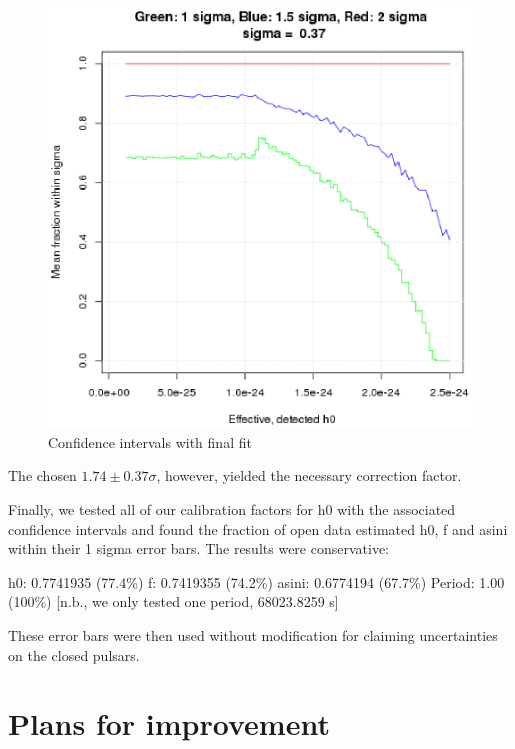 \begin{figure}
\begin{center}
\includegraphics[width=0.3\paperwidth,height=0.2\paperheight]{PlotSigmaDiffVsH0Eff.eps}
\caption{Confidence intervals with final fit
}
\end{center}
\end{figure}



The chosen $1.74 \pm 0.37 \sigma$, however, yielded the necessary correction factor.

Finally, we tested all of our calibration factors for h0 with the associated confidence intervals and found the fraction of open data estimated h0, f and asini within their 1 sigma error bars. The results were conservative:

h0: 0.7741935 (77.4\%)
f: 0.7419355 (74.2\%)
asini: 0.6774194 (67.7\%)
Period: 1.00 (100\%) [n.b., we only tested one period, 68023.8259 s]

These error bars were then used without modification for claiming uncertainties on the closed pulsars.



\section{Plans for improvement}

